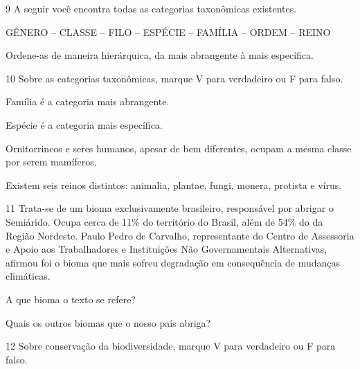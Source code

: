 \num{9}  A seguir você encontra todas as categorias taxonômicas existentes.

\begin{myquote}
GÊNERO -- CLASSE -- FILO -- ESPÉCIE -- FAMÍLIA -- ORDEM -- REINO
\end{myquote}

Ordene-as de maneira hierárquica, da mais abrangente à mais específica.



\num{10}  Sobre as categorias taxonômicas, marque V para verdadeiro ou F para falso.

\begin{boxlist}
 Família é a categoria mais abrangente.

 Espécie é a categoria mais específica.

 Ornitorrincos e seres humanos, apesar de bem diferentes, ocupam a
mesma classe por serem mamíferos.

 Existem seis reinos distintos: animalia, plantae, fungi, monera,
protista e vírus.
\end{boxlist}

\num{11} Trata-se de um bioma exclusivamente brasileiro, responsável por abrigar o Semiárido. 
  Ocupa cerca de 11\% do território do Brasil, além de 54\% do da Região
  Nordeste. Paulo
  Pedro de Carvalho, representante do Centro de Assessoria e Apoio aos
  Trabalhadores e Instituições Não Governamentais Alternativas, afirmou foi o bioma que mais sofreu
  degradação em consequência de mudanças climáticas.


\begin{escolha}
\item A que bioma o texto se refere?\\

\item Quais os outros biomas que o nosso país abriga?\\
\end{escolha}

\num{12}  Sobre conservação da biodiversidade, marque V para verdadeiro ou F para falso.

